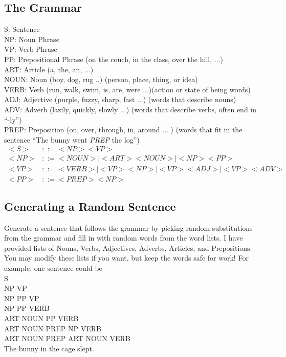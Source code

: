 \documentclass[11pt]{article}
\begin{document}
\newpage
\subsection*{The Grammar}
S: Sentence\\
NP: Noun Phrase\\
VP: Verb Phrase\\
PP: Prepositional Phrase (on the couch, in the class, over the hill, ...)\\
ART: Article (a, the, an, ...) \\
NOUN: Noun (boy, dog, rug ..) (person, place, thing, or idea)\\
VERB: Verb (run, walk, swim, is, are, were ...)(action or state of being words)\\
ADJ: Adjective (purple, fuzzy, sharp, fast ...) (words that describe nouns)\\
ADV: Adverb (lazily, quickly, slowly ...) (words that describe verbs, often end in ``-ly'')\\
PREP: Preposition (on, over, through, in, around ... ) (words that fit in the sentence ``The bunny went \textit{PREP} the log'')\\

\begin{align*}
<S> &::= <NP><VP>\\
<NP> &::= <NOUN> | <ART><NOUN> | <NP><PP>\\
<VP>  &::= <VERB> | <VP><NP> | <VP><ADJ> | <VP><ADV>\\
<PP> &::= <PREP><NP>
\end{align*}

\subsection*{Generating a Random Sentence}
Generate a sentence that follows the grammar by picking random
substitutions from the grammar and fill in with random words from the
word lists.  I have provided lists of Nouns, Verbs, Adjectives,
Adverbs, Articles, and Prepositions.  You may modify these lists if
you want, but keep the words safe for work!  For example, one sentence
could be\\

\noindent S\\
NP VP\\
NP PP VP\\
NP PP VERB\\
ART NOUN PP VERB\\
ART NOUN PREP NP VERB\\
ART NOUN PREP ART NOUN VERB\\
The bunny in the cage slept.\\
\end{document}
